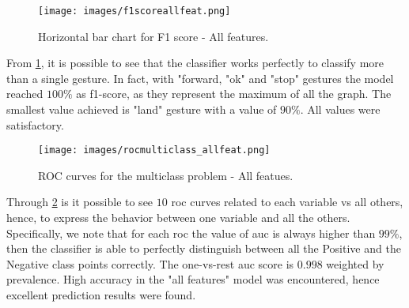 \begin{figure}[H]
	\centering
	\texttt{[image: images/f1scoreallfeat.png]}
	\caption[Horizontal bar chart for F1 score - All features.]{Horizontal bar chart for F1 score - All features.}
	\label{fig:f1allfeat}
\end{figure}

\noindent From \ref{fig:f1allfeat}, it is possible to see that the classifier works perfectly to classify more than a single gesture. In fact, with "forward, "ok" and "stop" gestures the model reached $100\%$ as f1-score, as they represent the maximum of all the graph. The smallest value achieved is "land" gesture with a value of $90\%$. All values were satisfactory. \\

\begin{figure}[H]
	\centering
	\texttt{[image: images/rocmulticlass\_allfeat.png]}
	\caption[ROC curves for the multiclass problem - All features.]{ROC curves for the multiclass problem - All featues.}
	\label{fig:roccurvesallfeatu}
\end{figure}

\noindent Through \ref{fig:roccurvesallfeatu} is it possible to see $10$ \gls{roc} curves related to each variable vs all others, hence, to express the behavior between one variable and all the others. Specifically, we note that for each \gls{roc} the value of \gls{auc} is always higher than $99\%$, then the classifier is able to perfectly distinguish between all the Positive and the Negative class points correctly. The one-vs-rest \gls{auc} score is $0.998$ weighted by prevalence. High accuracy in the "all features" model was encountered, hence excellent prediction results were found. \\

